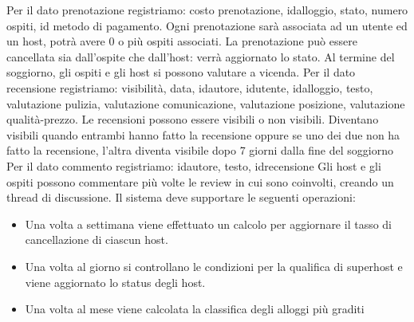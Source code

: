 \documentclass[letterpaper]{report}
\begin{document}
Per il dato prenotazione registriamo: costo prenotazione, idalloggio, stato, numero ospiti, id metodo di pagamento. Ogni prenotazione sarà associata ad un utente ed un host, potrà avere 0 o più ospiti associati. La prenotazione può essere cancellata sia dall'ospite che dall'host: verrà aggiornato lo stato.
\newline
\newline
Al termine del soggiorno, gli ospiti e gli host si possono valutare a vicenda. 
Per il dato recensione registriamo: visibilità, data, idautore, idutente, 
idalloggio, testo, valutazione pulizia, valutazione comunicazione, valutazione 
posizione, valutazione qualità-prezzo.
\newline
\newline
Le recensioni possono essere visibili o non visibili. Diventano visibili quando
entrambi hanno fatto la recensione oppure se uno dei due non ha fatto la recensione, l’altra
diventa visibile dopo 7 giorni dalla fine del soggiorno
\newline
\newline
Per il dato commento registriamo: idautore, testo, idrecensione
Gli host e gli ospiti possono commentare più volte le review in cui sono coinvolti, 
creando un thread di discussione.
\newline
\newline
Il sistema deve supportare le seguenti operazioni:
\begin{itemize}
    \item Una volta a settimana viene effettuato un calcolo per aggiornare 
    il tasso di cancellazione di ciascun host.
    \item Una volta al giorno si controllano le condizioni per la qualifica di 
    superhost e viene aggiornato lo status degli host.
    \item Una volta al mese viene calcolata la classifica degli alloggi più graditi
\end{itemize}
\end{document}
